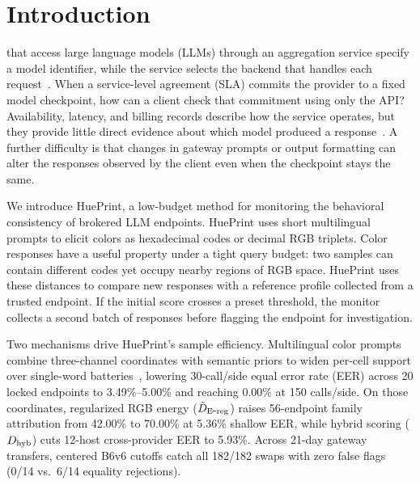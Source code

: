 \section{Introduction}
\label{sec:introduction}

 that access large language models (LLMs)
through an aggregation service specify a model identifier, while the
service selects the backend that handles each request~\cite{ref1,ref2,ref3}. When a
service-level agreement (SLA) commits the provider to a fixed model
checkpoint, how can a client check that commitment using only the API?
Availability, latency, and billing records describe how the service
operates, but they provide little direct evidence about which model
produced a response~\cite{ref4,ref5,ref6}. A further difficulty is that changes in gateway
prompts or output formatting can alter the responses observed by the
client even when the checkpoint stays the same.

We introduce HuePrint, a low-budget method for monitoring the
behavioral consistency of brokered LLM endpoints. HuePrint uses short
multilingual prompts to elicit colors as hexadecimal codes or decimal
RGB triplets. Color responses have a useful property under a tight
query budget: two samples can contain different codes yet occupy
nearby regions of RGB space. HuePrint uses these distances to compare
new responses with a reference profile collected from a trusted
endpoint. If the initial score crosses a preset threshold, the monitor
collects a second batch of responses before flagging the endpoint for
investigation.

Two mechanisms drive HuePrint's sample efficiency. Multilingual color prompts combine three-channel coordinates with semantic priors to widen per-cell support over single-word batteries~\cite{ref7}, lowering 30-call/side equal error rate (EER) across 20 locked endpoints to 3.49\%--5.00\% and reaching 0.00\% at 150 calls/side. On those coordinates, regularized RGB energy ($\tilde D_{\mathrm{E\mbox{-}reg}}{}$) raises 56-endpoint family attribution from 42.00\% to 70.00\% at 5.36\% shallow EER, while hybrid scoring ($D_{\mathrm{hyb}}{}$) cuts 12-host cross-provider EER to 5.93\%. Across 21-day gateway transfers, centered B6v6 cutoffs catch all 182/182 swaps with zero false flags (0/14 vs.\ 6/14 equality rejections).

